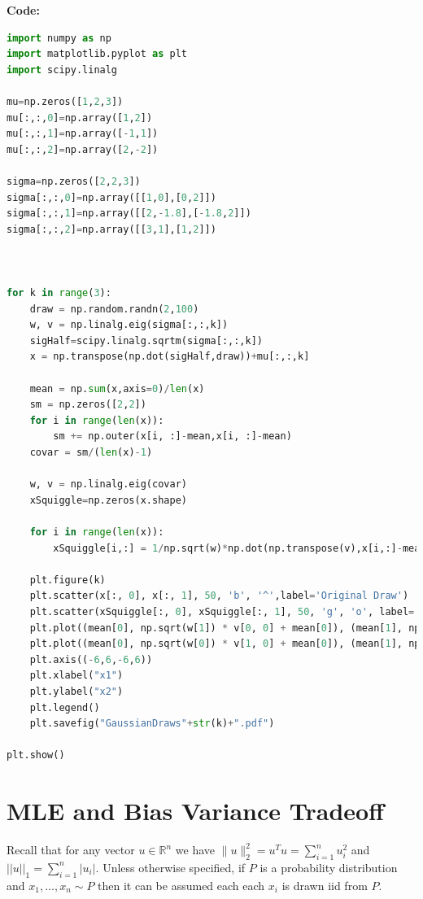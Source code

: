 \documentclass{article}
\newcommand{\1}{\mathbf{1}}
\def\R{\mathbb{R}}
\begin{document}
 \textbf{Code:}
 \begin{lstlisting}[language=Python]
import numpy as np
import matplotlib.pyplot as plt
import scipy.linalg

mu=np.zeros([1,2,3])
mu[:,:,0]=np.array([1,2])
mu[:,:,1]=np.array([-1,1])
mu[:,:,2]=np.array([2,-2])

sigma=np.zeros([2,2,3])
sigma[:,:,0]=np.array([[1,0],[0,2]])
sigma[:,:,1]=np.array([[2,-1.8],[-1.8,2]])
sigma[:,:,2]=np.array([[3,1],[1,2]])



for k in range(3):
    draw = np.random.randn(2,100)
    w, v = np.linalg.eig(sigma[:,:,k])
    sigHalf=scipy.linalg.sqrtm(sigma[:,:,k])
    x = np.transpose(np.dot(sigHalf,draw))+mu[:,:,k]

    mean = np.sum(x,axis=0)/len(x)
    sm = np.zeros([2,2])
    for i in range(len(x)):
        sm += np.outer(x[i, :]-mean,x[i, :]-mean)
    covar = sm/(len(x)-1)

    w, v = np.linalg.eig(covar)
    xSquiggle=np.zeros(x.shape)

    for i in range(len(x)):
        xSquiggle[i,:] = 1/np.sqrt(w)*np.dot(np.transpose(v),x[i,:]-mean)

    plt.figure(k)
    plt.scatter(x[:, 0], x[:, 1], 50, 'b', '^',label='Original Draw')
    plt.scatter(xSquiggle[:, 0], xSquiggle[:, 1], 50, 'g', 'o', label='Transformed')
    plt.plot((mean[0], np.sqrt(w[1]) * v[0, 0] + mean[0]), (mean[1], np.sqrt(w[1]) * v[0, 1] + mean[1]),'r', linewidth=2,label='Eigen Vectors')
    plt.plot((mean[0], np.sqrt(w[0]) * v[1, 0] + mean[0]), (mean[1], np.sqrt(w[0]) * v[1, 1] + mean[1]),'r', linewidth=2)
    plt.axis((-6,6,-6,6))
    plt.xlabel("x1")
    plt.ylabel("x2")
    plt.legend()
    plt.savefig("GaussianDraws"+str(k)+".pdf")

plt.show()

 \end{lstlisting}

\section{MLE and Bias Variance Tradeoff}
Recall that for any vector $u \in \R^n$ we have $\|u\|_2^2 = u^T u = \sum_{i=1}^n u_i^2$ and $||u||_1 = \sum_{i=1}^n |u_i|$. 
Unless otherwise specified, if $P$ is a probability distribution and $x_1,\dots,x_n \sim P$ then it can be assumed each each $x_i$ is drawn iid from $P$. 
\end{document}
